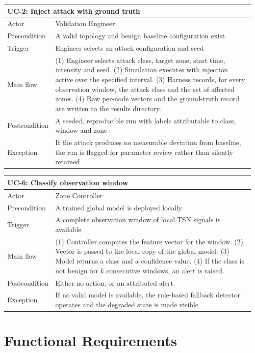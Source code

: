 \begin{longtable}{p{} p{}}
\toprule
\multicolumn{2}{l}{\textbf{UC-2: Inject attack with ground truth}} \\
\midrule
\endfirsthead
Actor & Validation Engineer \\
Precondition & A valid topology and benign baseline configuration exist \\
Trigger & Engineer selects an attack configuration and seed \\
Main flow &
(1) Engineer selects attack class, target zone, start time, intensity and seed.
(2) Simulation executes with injection active over the specified interval.
(3) Harness records, for every observation window, the attack class and the set of
affected zones.
(4) Raw per-node vectors and the ground-truth record are written to the results
directory. \\
Postcondition & A seeded, reproducible run with labels attributable to class, window
and zone \\
Exception & If the attack produces no measurable deviation from baseline, the run is
flagged for parameter review rather than silently retained \\
\bottomrule
\end{longtable}

\begin{longtable}{p{} p{}}
\toprule
\multicolumn{2}{l}{\textbf{UC-6: Classify observation window}} \\
\midrule
\endfirsthead
Actor & Zone Controller \\
Precondition & A trained global model is deployed locally \\
Trigger & A complete observation window of local TSN signals is available \\
Main flow &
(1) Controller computes the feature vector for the window.
(2) Vector is passed to the local copy of the global model.
(3) Model returns a class and a confidence value.
(4) If the class is not benign for $k$ consecutive windows, an alert is raised. \\
Postcondition & Either no action, or an attributed alert \\
Exception & If no valid model is available, the rule-based fallback detector operates
and the degraded state is made visible \\
\bottomrule
\end{longtable}

\section{Functional Requirements}


